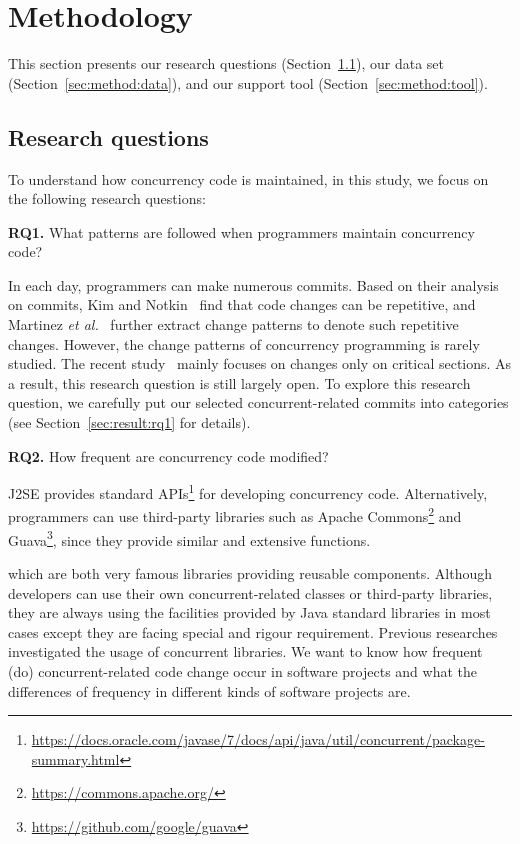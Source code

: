 \section{Methodology}
\label{sec:method}
This section presents our research questions (Section~\ref{sec:method:rq}), our data set (Section~\ref{sec:method:data}), and our support tool (Section~\ref{sec:method:tool}).
\subsection{Research questions}
\label{sec:method:rq}
To understand how concurrency code is maintained, in this study, we focus on the following research questions:

\textbf{RQ1.} What patterns are followed when programmers maintain concurrency code?

In each day, programmers can make numerous commits. Based on their analysis on commits, Kim and Notkin~\cite{conf/icse/KimN09} find that code changes can be repetitive, and Martinez \emph{et al.}~\cite{conf/icsm/MartinezDM13} further extract change patterns to denote such repetitive changes. However, the change patterns of concurrency programming is rarely studied. The recent study~\cite{conf/sigsoft/GuJSZL15} mainly focuses on changes only on critical sections. As a result, this research question is still largely open. To explore this research question, we carefully put our selected concurrent-related commits into  categories (see Section~\ref{sec:result:rq1} for details). 

\textbf{RQ2.} How frequent are concurrency code modified?

J2SE provides standard APIs\footnote{\url{https://docs.oracle.com/javase/7/docs/api/java/util/concurrent/package-summary.html}} for developing concurrency code. Alternatively, programmers can use third-party libraries such as Apache Commons\footnote{\url{https://commons.apache.org/}} and Guava\footnote{\url{https://github.com/google/guava}}, since they provide similar and extensive functions. 



which are both very famous libraries providing reusable components. Although developers can use their own concurrent-related classes or third-party libraries, they are always using the facilities provided by Java standard libraries in most cases except they are facing special and rigour requirement. Previous researches \cite{journals/jss/PintoTFFB15, journals/infsof/WuCZX16, conf/sigsoft/OkurD12} investigated the usage of concurrent libraries. We want to know how frequent (do) concurrent-related code change occur in software projects and what the differences of frequency in different kinds of software projects are.

